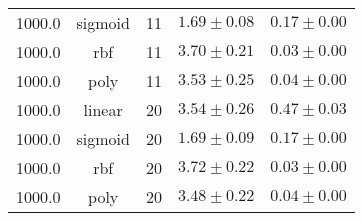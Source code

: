 \begin{tabular}{cccrr}
1000.0 & sigmoid & 11 & $1.69 \pm 0.08$ & $0.17 \pm 0.00$\\
1000.0 & rbf & 11 & $3.70 \pm 0.21$ & $0.03 \pm 0.00$\\
1000.0 & poly & 11 & $3.53 \pm 0.25$ & $0.04 \pm 0.00$\\
1000.0 & linear & 20 & $3.54 \pm 0.26$ & $0.47 \pm 0.03$\\
1000.0 & sigmoid & 20 & $1.69 \pm 0.09$ & $0.17 \pm 0.00$\\
1000.0 & rbf & 20 & $3.72 \pm 0.22$ & $0.03 \pm 0.00$\\
1000.0 & poly & 20 & $3.48 \pm 0.22$ & $0.04 \pm 0.00$\\
\bottomrule
\end{tabular}
